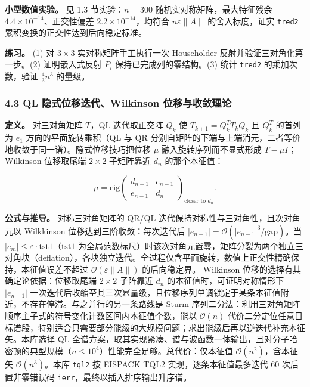 \documentclass[
]{ctexbook}
\begin{document}
\textbf{小型数值实验。} 见 1.3 节实验：\(n=300\)
随机实对称矩阵，最大特征残余 \(4.4\times10^{-14}\)、正交性偏差
\(2.2\times10^{-14}\)，均符合 \(n\varepsilon\|A\|\) 的舍入标度，证实
\texttt{tred2} 累积变换的正交性达到后向稳定标准。

\textbf{练习。} (1) 对 \(3\times3\) 实对称矩阵手工执行一次 Householder
反射并验证三对角化第一步。(2) 证明嵌入式反射 \(P_i\)
保持已完成列的零结构。(3) 统计 \texttt{tred2} 的乘加次数，验证
\(\frac{4}{3}n^{3}\) 的量级。

\hypertarget{ql-ux9690ux5f0fux4f4dux79fbux8fedux4ee3wilkinson-ux4f4dux79fbux4e0eux6536ux655bux7406ux8bba}{%
\subsubsection{4.3 QL 隐式位移迭代、Wilkinson
位移与收敛理论}\label{ql-ux9690ux5f0fux4f4dux79fbux8fedux4ee3wilkinson-ux4f4dux79fbux4e0eux6536ux655bux7406ux8bba}}

\textbf{定义。} 对三对角矩阵 \(T\)，QL 迭代取正交阵 \(Q_k\) 使
\(T_{k+1}=Q_k^{T}T_kQ_k\) 且 \(Q_k^{T}\) 的首列为 \(e_1\)
方向的平面旋转乘积（QL 与 QR
分别自矩阵的下端与上端消元，二者等价地收敛于同一谱）。隐式位移技巧把位移
\(\mu\) 融入旋转序列而不显式形成 \(T-\mu I\)；Wilkinson 位移取尾端
\(2\times2\) 子矩阵靠近 \(d_n\) 的那个本征值：

\[\mu=\mathrm{eig}\begin{pmatrix} d_{n-1} & e_{n-1} \\ e_{n-1} & d_n \end{pmatrix}_{\text{closer to } d_n}.\]

\textbf{公式与推导。} 对称三对角矩阵的 QR/QL
迭代保持对称性与三对角性，且次对角元以 Wilkkinson
位移达到三阶收敛：每次迭代后
\(|e_{n-1}|=\mathcal{O}(|e_{n-1}|^{3}/\mathrm{gap})\)。当
\(|e_m|\le\varepsilon\cdot\mathrm{tst1}\)（\(\mathrm{tst1}\)
为全局范数标尺）时该次对角元置零，矩阵分裂为两个独立三对角块（deflation），各块独立迭代。全过程仅含平面旋转，数值上正交性精确保持，本征值误差不超过
\(\mathcal{O}(\varepsilon\|A\|)\) 的后向稳定界。 Wilkinson
位移的选择有其确定论依据：位移取尾端 \(2\times2\) 子阵靠近 \(d_n\)
的本征值时，可证明对称情形下 \(|e_{n-1}|\)
一次迭代后收缩至其三次幂量级，且位移序列单调锁定于某条本征值附近，不存在停滞。与之并行的另一条路线是
Sturm
序列二分法：利用三对角矩阵顺序主子式的符号变化计数区间内本征值个数，能以
\(\mathcal{O}(n)\)
代价二分定位任意目标谱段，特别适合只需要部分能级的大规模问题；求出能级后再以逆迭代补充本征矢。本库选择
QL
全谱方案，取其实现紧凑、谱与波函数一体输出，且对分子哈密顿的典型规模（\(n\le10^{4}\)）性能完全足够。总代价：仅本征值
\(\mathcal{O}(n^{2})\)，含本征矢 \(\mathcal{O}(n^{3})\)。本库
\texttt{tql2} 按 EISPACK TQL2 实现，逐条本征值最多迭代 60
次后置非零错误码 \texttt{ierr}，最终以插入排序输出升序谱。
\end{document}

